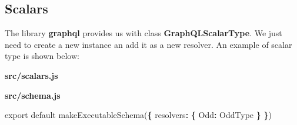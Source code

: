 \documentclass[]{book}
\newenvironment{Shaded}{\begin{snugshade}}{\end{snugshade}}
\newcommand{\KeywordTok}[1]{\textcolor[rgb]{0.13,0.29,0.53}{\textbf{#1}}}
\newcommand{\DataTypeTok}[1]{\textcolor[rgb]{0.13,0.29,0.53}{#1}}
\newcommand{\DecValTok}[1]{\textcolor[rgb]{0.00,0.00,0.81}{#1}}
\newcommand{\StringTok}[1]{\textcolor[rgb]{0.31,0.60,0.02}{#1}}
\newcommand{\ImportTok}[1]{#1}
\newcommand{\VariableTok}[1]{\textcolor[rgb]{0.00,0.00,0.00}{#1}}
\newcommand{\ControlFlowTok}[1]{\textcolor[rgb]{0.13,0.29,0.53}{\textbf{#1}}}
\newcommand{\OperatorTok}[1]{\textcolor[rgb]{0.81,0.36,0.00}{\textbf{#1}}}
\newcommand{\AttributeTok}[1]{\textcolor[rgb]{0.77,0.63,0.00}{#1}}
\newcommand{\NormalTok}[1]{#1}
\begin{document}
\subsection{Scalars}\label{scalars}

The library \textbf{graphql} provides us with class
\textbf{GraphQLScalarType}. We just need to create a new instance an add
it as a new resolver. An example of scalar type is shown below:

\textbf{src/scalars.js}

\begin{Shaded}
\end{Shaded}

\textbf{src/schema.js}

\begin{Shaded}
\begin{Highlighting}[]
\ImportTok{export} \ImportTok{default} \AttributeTok{makeExecutableSchema}\NormalTok{(}\OperatorTok{\{}
    \DataTypeTok{resolvers}\OperatorTok{:} \OperatorTok{\{}
        \DataTypeTok{Odd}\OperatorTok{:}\NormalTok{ OddType}
    \OperatorTok{\}}
\OperatorTok{\}}\NormalTok{)}
\end{Highlighting}
\end{Shaded}
\end{document}
